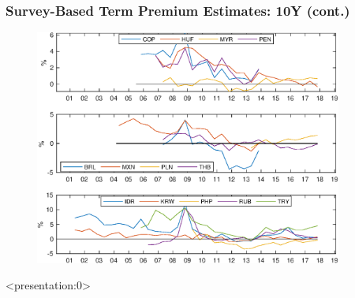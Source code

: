 \documentclass[12pt, aspectratio=169, xcolor=dvipsnames]{beamer}  %
\begin{document}
\begin{frame}
\frametitle{Survey-Based Term Premium Estimates: 10Y (cont.)}
\begin{figure}[!htbp]
	\begin{center}
		\includegraphics[trim={0 0 0 4cm}, clip, width=0.9\textwidth, height=0.65\textheight]{../Figures/Temp/temp_tp10yrSvy}
		\par\end{center}
\end{figure}
%	
\end{frame}

\begin{frame}<presentation:0>
 

\end{frame}
\end{document}
